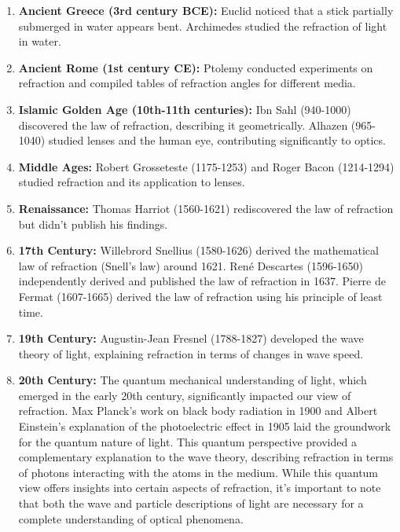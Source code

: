 \documentclass[
  a4paper,
]{book}
\begin{document}
\begin{tcolorbox}
\begin{enumerate}
\def\labelenumi{\arabic{enumi}.}
\item
  \textbf{Ancient Greece (3rd century BCE):} Euclid noticed that a stick
  partially submerged in water appears bent. Archimedes studied the
  refraction of light in water.
\item
  \textbf{Ancient Rome (1st century CE):} Ptolemy conducted experiments
  on refraction and compiled tables of refraction angles for different
  media.
\item
  \textbf{Islamic Golden Age (10th-11th centuries):} Ibn Sahl (940-1000)
  discovered the law of refraction, describing it geometrically. Alhazen
  (965-1040) studied lenses and the human eye, contributing
  significantly to optics.
\item
  \textbf{Middle Ages:} Robert Grosseteste (1175-1253) and Roger Bacon
  (1214-1294) studied refraction and its application to lenses.
\item
  \textbf{Renaissance:} Thomas Harriot (1560-1621) rediscovered the law
  of refraction but didn't publish his findings.
\item
  \textbf{17th Century:} Willebrord Snellius (1580-1626) derived the
  mathematical law of refraction (Snell's law) around 1621. René
  Descartes (1596-1650) independently derived and published the law of
  refraction in 1637. Pierre de Fermat (1607-1665) derived the law of
  refraction using his principle of least time.
\item
  \textbf{19th Century:} Augustin-Jean Fresnel (1788-1827) developed the
  wave theory of light, explaining refraction in terms of changes in
  wave speed.
\item
  \textbf{20th Century:} The quantum mechanical understanding of light,
  which emerged in the early 20th century, significantly impacted our
  view of refraction. Max Planck's work on black body radiation in 1900
  and Albert Einstein's explanation of the photoelectric effect in 1905
  laid the groundwork for the quantum nature of light. This quantum
  perspective provided a complementary explanation to the wave theory,
  describing refraction in terms of photons interacting with the atoms
  in the medium. While this quantum view offers insights into certain
  aspects of refraction, it's important to note that both the wave and
  particle descriptions of light are necessary for a complete
  understanding of optical phenomena.
\end{enumerate}

\end{tcolorbox}
\end{document}
